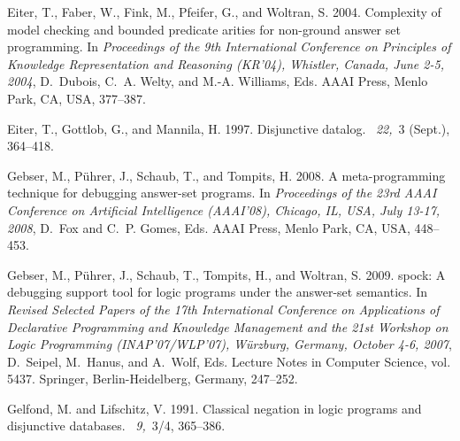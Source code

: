 \documentclass{tlp}
\begin{document}
\begin{thebibliography}{}
{\sc Eiter, T.}, {\sc Faber, W.}, {\sc Fink, M.}, {\sc Pfeifer, G.}, {\sc and}
  {\sc Woltran, S.} 2004.
\newblock Complexity of model checking and bounded predicate arities for
  non-ground answer set programming.
\newblock In {\em Proceedings of the 9th International Conference on Principles
  of Knowledge Representation and Reasoning {\rm (}KR'04{\rm )}, Whistler,
  Canada, June 2-5, 2004}, {D.~Dubois}, {C.~A. Welty}, {and} {M.-A. Williams},
  Eds. AAAI Press, Menlo Park, CA, USA, 377--387.

{\sc Eiter, T.}, {\sc Gottlob, G.}, {\sc and} {\sc Mannila, H.} 1997.
\newblock Disjunctive datalog.
~{\em 22,\/}~3 (Sept.),
  364--418.

{\sc Gebser, M.}, {\sc P{\"u}hrer, J.}, {\sc Schaub, T.}, {\sc and} {\sc
  Tompits, H.} 2008.
\newblock A meta-programming technique for debugging answer-set programs.
\newblock In {\em Proceedings of the 23rd {AAAI} Conference on Artificial
  Intelligence {\rm (}AAAI'08{\rm )}, Chicago, IL, USA, July 13-17, 2008},
  {D.~Fox} {and} {C.~P. Gomes}, Eds. AAAI Press, Menlo Park, CA, USA, 448--453.

{\sc Gebser, M.}, {\sc P{\"u}hrer, J.}, {\sc Schaub, T.}, {\sc Tompits, H.},
  {\sc and} {\sc Woltran, S.} 2009.
\newblock spock: {A} debugging support tool for logic programs under the
  answer-set semantics.
\newblock In {\em Revised Selected Papers of the 17th International Conference
  on Applications of Declarative Programming and Knowledge Management and the
  21st Workshop on Logic Programming {\rm (}INAP'07/WLP'07{\rm )},
  W{\"u}rzburg, Germany, October 4-6, 2007}, {D.~Seipel}, {M.~Hanus}, {and}
  {A.~Wolf}, Eds. Lecture Notes in Computer Science, vol. 5437. Springer,
  Berlin-Heidelberg, Germany, 247--252.

{\sc Gelfond, M.} {\sc and} {\sc Lifschitz, V.} 1991.
\newblock Classical negation in logic programs and disjunctive databases.
~{\em 9,\/}~3/4, 365--386.


\end{thebibliography}
\end{document}
